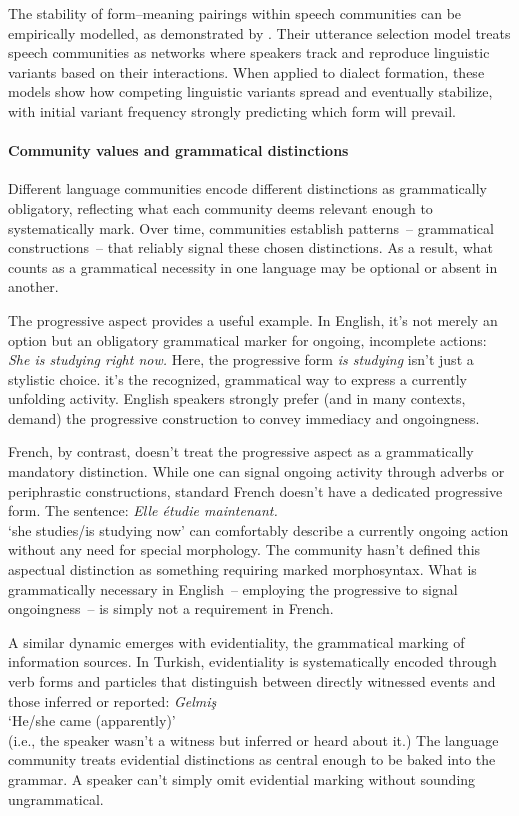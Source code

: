 \documentclass[12pt,letterpaper]{article}
\begin{document}
The stability of form--meaning pairings within speech communities can be empirically modelled, as demonstrated by \textcite{blythe2009speech}. Their utterance selection model treats speech communities as networks where speakers track and reproduce linguistic variants based on their interactions. When applied to dialect formation, these models show how competing linguistic variants spread and eventually stabilize, with initial variant frequency strongly predicting which form will prevail.

\paragraph{Community values and grammatical distinctions}

Different language communities encode different distinctions as grammatically obligatory, reflecting what each community deems relevant enough to systematically mark. Over time, communities establish patterns~-- grammatical constructions~-- that reliably signal these chosen distinctions. As a result, what counts as a grammatical necessity in one language may be optional or absent in another.

The progressive aspect provides a useful example. In English, it's not merely an option but an obligatory grammatical marker for ongoing, incomplete actions:
\ea
\textit{She is studying right now.}
\z
Here, the progressive form \textit{is studying} isn't just a stylistic choice. it's the recognized, grammatical way to express a currently unfolding activity. English speakers strongly prefer (and in many contexts, demand) the progressive construction to convey immediacy and ongoingness.

French, by contrast, doesn't treat the progressive aspect as a grammatically mandatory distinction. While one can signal ongoing activity through adverbs or periphrastic constructions, standard French doesn't have a dedicated progressive form. The sentence:
\ea
\textit{Elle étudie maintenant.}\\
`she studies/is studying now'
\z
can comfortably describe a currently ongoing action without any need for special morphology. The community hasn't defined this aspectual distinction as something requiring marked morphosyntax. What is grammatically necessary in English~-- employing the progressive to signal ongoingness~-- is simply not a requirement in French.

A similar dynamic emerges with evidentiality, the grammatical marking of information sources. In Turkish, evidentiality is systematically encoded through verb forms and particles that distinguish between directly witnessed events and those inferred or reported:
\ea
\textit{Gelmiş}\\
`He/she came (apparently)' \\(i.e., the speaker wasn't a witness but inferred or heard about it.)
\z
The language community treats evidential distinctions as central enough to be baked into the grammar. A speaker can't simply omit evidential marking without sounding ungrammatical.
\end{document}
